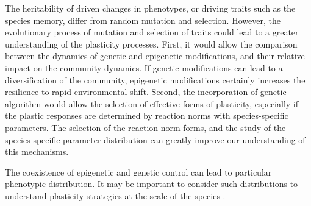 The heritability of driven changes in phenotypes, or driving traits such as the species memory, differ from random mutation and selection. However, the evolutionary process of mutation and selection of traits could lead to a greater understanding of the plasticity processes. First, it would allow the comparison between the dynamics of genetic and epigenetic modifications, and their relative impact on the community dynamics. If genetic modifications can lead to a diversification of the community, epigenetic modifications certainly increases the resilience to rapid environmental shift. Second, the incorporation of genetic algorithm would allow the selection of effective forms of plasticity, especially if the plastic responses are determined by reaction norms with species-specific parameters. The selection of the reaction norm forms, and the study of the species specific parameter distribution can greatly improve our understanding of this mechanisms.

The coexistence of epigenetic and genetic control can lead to particular phenotypic distribution. It may be important to consider such distributions to understand plasticity strategies at the scale of the species \parencite{dewitt_expanding_2016}.


